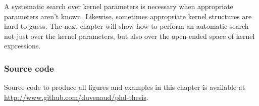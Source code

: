 
A systematic search over kernel parameters is necessary when appropriate parameters aren't known.
Likewise, sometimes appropriate kernel structures are hard to guess.
The next chapter will show how to perform an automatic search not just over the kernel parameters, but also over the open-ended space of kernel expressions.

\subsubsection{Source code}
Source code to produce all figures and examples in this chapter is available at \\\url{http://www.github.com/duvenaud/phd-thesis}.



